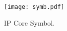 \begin{figure}[!htbp]
  \centerline{\texttt{[image: symb.pdf]}}
  \vspace{0cm}
  \caption{IP Core Symbol.}
  \label{fig:symbol}
\end{figure}
